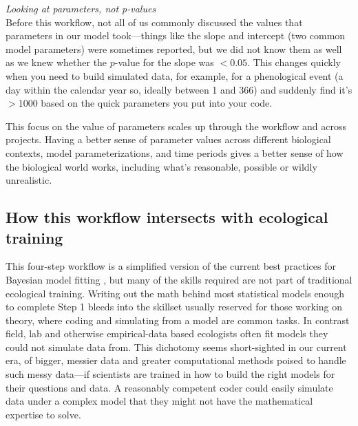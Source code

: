 \documentclass[11pt]{article}
\begin{document}
{ \emph{Looking at parameters, not p-values} \\
Before this workflow, not all of us commonly discussed the values that parameters in our model took---things like the slope and intercept (two common model parameters) were sometimes reported, but we did not know them as well as we knew whether the $p$-value for the slope was $<0.05$. This changes quickly when you need to build simulated data, for example, for a phenological event (a day within the calendar year so, ideally between 1 and 366) and suddenly find it's $>$1000 based on the quick parameters you put into your code. 

This focus on the value of parameters scales up through the workflow and across projects. Having a better sense of parameter values across different biological contexts, model parameterizations, and time periods gives a better sense of how the biological world works, including what's reasonable, possible or wildly unrealistic. %

\subsection{How this workflow intersects with ecological training} %

This four-step workflow is a simplified version of the current best practices for Bayesian model fitting  \citep{betanworkflow,vandeschoot2021}, but many of the skills required are not part of traditional ecological training. Writing out the math behind most statistical models enough to complete Step 1 bleeds into the skillset usually reserved for those working on theory, where coding and simulating from a model are common tasks. In contrast field, lab and otherwise empirical-data based ecologists often fit models they could not simulate data from. This dichotomy seems short-sighted in our current era, of bigger, messier data and greater computational methods poised to handle such messy data---if scientists are trained in how to build the right models for their questions and data. A reasonably competent coder could easily simulate data under a complex model that they might not have the mathematical expertise to solve. %

}
\end{document}
